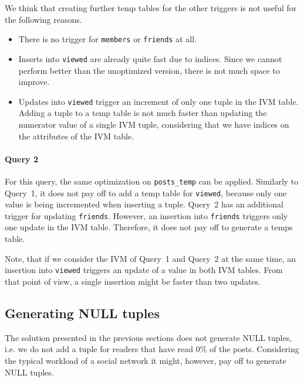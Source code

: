 \documentclass[12pt]{article}
\begin{document}
We think that creating further temp tables for the other triggers is not useful for the following reasons.

\begin{itemize}
	\item There is no trigger for \lstinline{members} or \lstinline{friends} at all.
    \item Inserts into \lstinline{viewed} are already quite fast due to indices. Since we cannot perform better than the unoptimized version, there is not much space to improve.
    \item Updates into \lstinline{viewed} trigger an increment of only one tuple in the IVM table. Adding a tuple to a temp table is not much faster than updating the numerator value of a single IVM tuple, considering that we have indices on the attributes of the IVM table.
\end{itemize}

\paragraph{Query 2}
For this query, the same optimization on \lstinline{posts_temp} can be applied. Similarly to Query~1, it does not pay off to add a temp table for \lstinline{viewed}, because only one value is being incremented when inserting a tuple. Query~2 has an additional trigger for updating \lstinline{friends}. However, an insertion into \lstinline{friends} triggers only one update in the IVM table. Therefore, it does not pay off to generate a temps table.

Note, that if we consider the IVM of Query~1 and Query~2 at the same time, an insertion into \lstinline{viewed} triggers an update of a value in both IVM tables. From that point of view, a single insertion might be faster than two updates.

\subsection{Generating NULL tuples}
The solution presented in the previous sections does not generate NULL tuples, i.e. we do not add a tuple for readers that have read 0\% of the posts. Considering the typical workload of a social network it might, however, pay off to generate NULL tuples.
\end{document}
